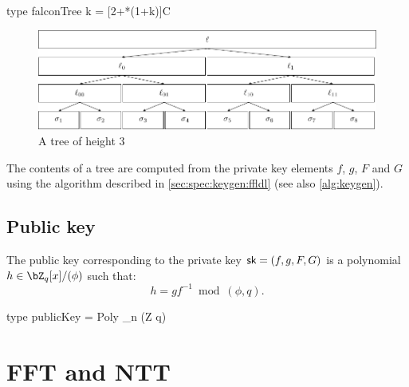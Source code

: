 \begin{code}
  type falconTree k = [2^^k*(1+k)]C
\end{code}

 \begin{figure}%
\centering
\includegraphics[width=\textwidth]{tikz/FalconTree}
\caption{A \falcon tree of height $3$}\label{fig:falcontree}
\end{figure}

The contents of a \falcon tree \tree are computed from the private key
elements $f$, $g$, $F$ and $G$ using the algorithm described in
\cref{sec:spec:keygen:ffldl} (see also \cref{alg:keygen}).

\subsection{Public key}

The \falcon public key \pk corresponding to the private key $\textsf{sk} =
(f,g,F,G)$ is a polynomial $h \in \bZ_q[x]/(\phi)$ such that:
 \begin{equation}
  h = gf^{-1} \bmod (\phi,q).
 \end{equation}

\begin{code}
  type publicKey = Poly _n (Z q)
\end{code}

 \section{FFT and NTT} \label{sec:spec:fftntt}

